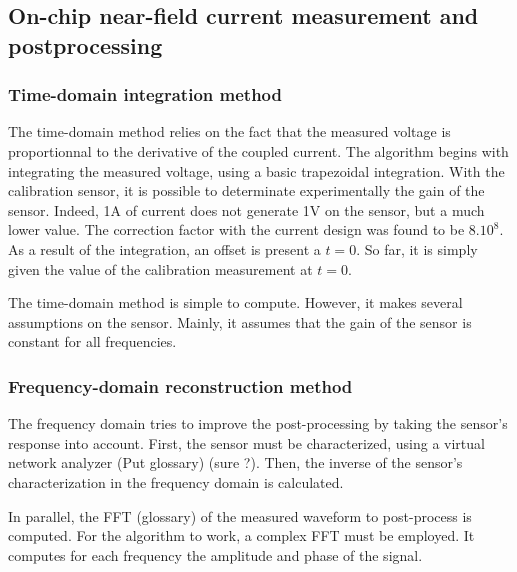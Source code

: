 \subsection{On-chip near-field current measurement and postprocessing}
\label{sec:on-chip-near-field-process}


\subsubsection{Time-domain integration method}

The time-domain method relies on the fact that the measured voltage is proportionnal to the derivative of the coupled current.
The algorithm begins with integrating the measured voltage, using a basic trapezoidal integration.
With the calibration sensor, it is possible to determinate experimentally the gain of the sensor.
Indeed, 1A of current does not generate 1V on the sensor, but a much lower value.
The correction factor with the current design was found to be $8.10^8$.
As a result of the integration, an offset is present a $t=0$.
So far, it is simply given the value of the calibration measurement at $t=0$.


The time-domain method is simple to compute.
However, it makes several assumptions on the sensor.
Mainly, it assumes that the gain of the sensor is constant for all frequencies.

\subsubsection{Frequency-domain reconstruction method}

The frequency domain tries to improve the post-processing by taking the sensor's response into account.
First, the sensor must be characterized, using a virtual network analyzer (Put glossary) (sure ?).
Then, the inverse of the sensor's characterization in the frequency domain is calculated.


In parallel, the FFT (glossary) of the measured waveform to post-process is computed.
For the algorithm to work, a complex FFT must be employed.
It computes for each frequency the amplitude and phase of the signal.

